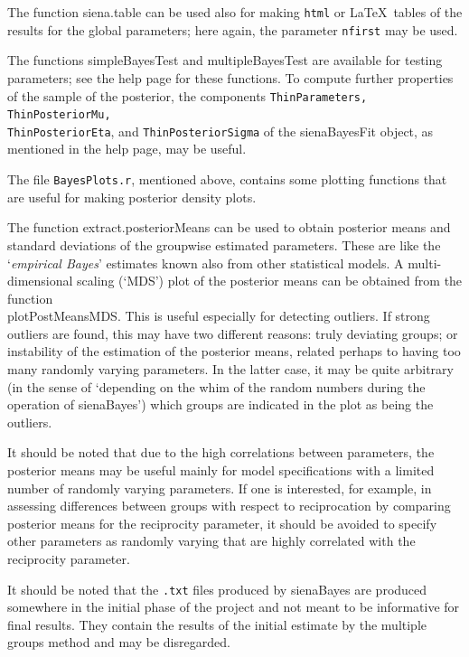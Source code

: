 \documentclass[a4paper,fleqn,11pt]{article}
\newcommand{\+}{\, + \,}
\newcommand{\sfn}[1]{\textsf{#1}}
\begin{document}
The function \textsf{siena.table} can be used also for making
\texttt{html} or \LaTeX\ tables of the results for the global parameters;
here again, the parameter \texttt{nfirst} may be used.

The functions \sfn{simpleBayesTest} and \sfn{multipleBayesTest}
are available for testing parameters; see the help page for these functions.
To compute further properties of the sample of the posterior,
the components
\texttt{ThinParameters, ThinPosteriorMu, \\
ThinPosteriorEta}, and \texttt{ThinPosteriorSigma} of the
\sfn{sienaBayesFit} object, as mentioned in the help page, may be useful.

The file \texttt{BayesPlots.r}, mentioned above, contains some plotting
functions that are useful for making posterior density plots.

The function \sfn{extract.posteriorMeans} can be used to obtain
posterior means and standard deviations of the groupwise estimated
parameters. These are like the `\emph{empirical Bayes}' estimates
known also from other statistical models.
A multi-dimensional scaling (`MDS') plot of the posterior means
can be obtained from the function \\
\sfn{plotPostMeansMDS}.
This is useful especially for detecting outliers.
If strong outliers are found, this may have two different reasons:
truly deviating groups; or instability of the estimation
of the posterior means, related perhaps to having too many
randomly varying parameters.
In the latter case, it may be quite arbitrary (in the sense of
`depending on the whim of the random numbers during the
operation of \textsf{sienaBayes}') which groups are
indicated in the plot as being the outliers.

It should be noted that due to the high correlations between parameters,
the posterior means may be useful mainly for model specifications
with a limited number of randomly varying parameters.
If one is interested, for example, in assessing differences
between groups with respect to reciprocation by comparing
posterior means for the reciprocity parameter, it should be avoided
to specify other parameters as randomly varying that are
highly correlated with the reciprocity parameter.

It should be noted that the \texttt{.txt} files produced by \sfn{sienaBayes}
are produced somewhere in the initial phase of the project and not meant
to be informative for final results. They contain the results of the
initial estimate by the multiple groups method and may be disregarded.
\medskip
\end{document}
